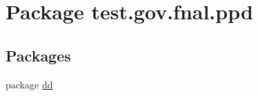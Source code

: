 \hypertarget{namespacetest_1_1gov_1_1fnal_1_1ppd}{\section{Package test.\-gov.\-fnal.\-ppd}
\label{namespacetest_1_1gov_1_1fnal_1_1ppd}
}
\subsection*{Packages}
\begin{DoxyCompactItemize}
\item 
package \hyperlink{namespacetest_1_1gov_1_1fnal_1_1ppd_1_1dd}{dd}
\end{DoxyCompactItemize}
